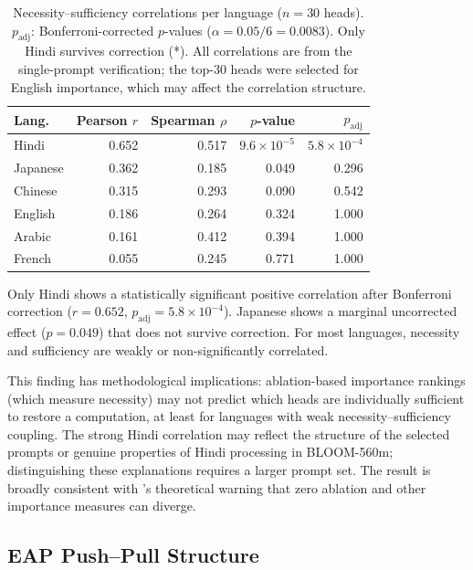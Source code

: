 \documentclass[11pt]{article}
\begin{document}
\begin{table}[t]
\centering
\small
\begin{tabular}{lrrrr}
\toprule
\textbf{Lang.} & \textbf{Pearson $r$} & \textbf{Spearman $\rho$} & \textbf{$p$-value} & \textbf{$p_{\text{adj}}$} \\
\midrule
Hindi    & 0.652 & 0.517 & $9.6 \times 10^{-5}$ & $5.8 \times 10^{-4}$\rlap{*} \\
Japanese & 0.362 & 0.185 & 0.049 & 0.296 \\
Chinese  & 0.315 & 0.293 & 0.090 & 0.542 \\
English  & 0.186 & 0.264 & 0.324 & 1.000 \\
Arabic   & 0.161 & 0.412 & 0.394 & 1.000 \\
French   & 0.055 & 0.245 & 0.771 & 1.000 \\
\bottomrule
\end{tabular}
\caption{Necessity--sufficiency correlations per language ($n=30$ heads). $p_{\text{adj}}$: Bonferroni-corrected $p$-values ($\alpha = 0.05/6 = 0.0083$). Only Hindi survives correction (*). All correlations are from the single-prompt verification; the top-30 heads were selected for English importance, which may affect the correlation structure.}
\label{tab:necsuf}
\end{table}

Only Hindi shows a statistically significant positive correlation after Bonferroni correction ($r = 0.652$, $p_{\text{adj}} = 5.8 \times 10^{-4}$).
Japanese shows a marginal uncorrected effect ($p = 0.049$) that does not survive correction.
For most languages, necessity and sufficiency are weakly or non-significantly correlated.

This finding has methodological implications: ablation-based importance rankings (which measure necessity) may not predict which heads are individually sufficient to restore a computation, at least for languages with weak necessity--sufficiency coupling.
The strong Hindi correlation may reflect the structure of the selected prompts or genuine properties of Hindi processing in BLOOM-560m; distinguishing these explanations requires a larger prompt set.
The result is broadly consistent with \citet{li2024optimal}'s theoretical warning that zero ablation and other importance measures can diverge.

\subsection{EAP Push--Pull Structure}
\label{sec:results:eap}
\end{document}
